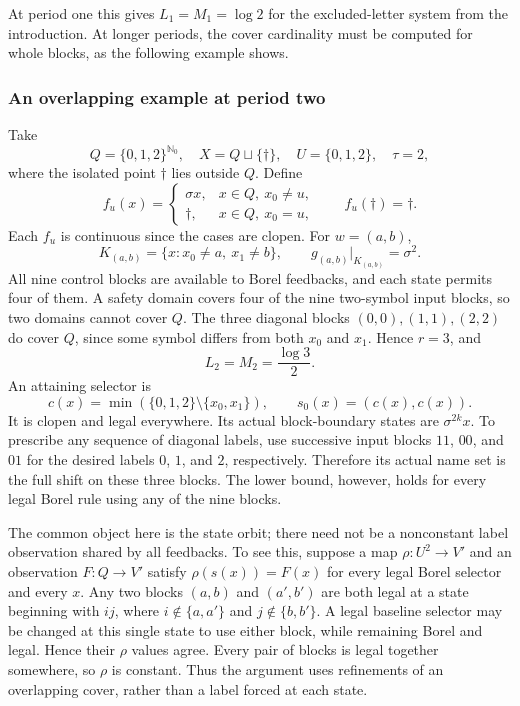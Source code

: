 \documentclass[11pt,reqno]{amsart}
\numberwithin{equation}{section}
\theoremstyle{definition}
\theoremstyle{definition}
\newcommand{\Nzero}{\mathbb N_0}
\begin{document}
At period one this gives $L_1=M_1=\log2$ for the excluded-letter
system from the introduction. At longer periods, the cover cardinality
must be computed for whole blocks, as the following example shows.

\subsubsection{An overlapping example at period two}

Take
\[
 Q=\{0,1,2\}^{\Nzero},\quad X=Q\sqcup\{\dagger\},\quad
 U=\{0,1,2\},\quad\tau=2,
\]
where the isolated point $\dagger$ lies outside $Q$. Define
\[
 f_u(x)=
 \begin{cases}\sigma x,&x\in Q,\ x_0\ne u,\\
 \dagger,&x\in Q,\ x_0=u,\end{cases}
 \qquad f_u(\dagger)=\dagger.
\]
Each $f_u$ is continuous since the cases are clopen. For $w=(a,b)$,
\[
 K_{(a,b)}=\{x:x_0\ne a,\ x_1\ne b\},\qquad
 g_{(a,b)}|_{K_{(a,b)}}=\sigma^2.
\]
All nine control blocks are available to Borel feedbacks, and each
state permits four of them. A safety domain covers four of the nine
two-symbol input blocks, so two domains cannot cover $Q$. The three
diagonal blocks $(0,0),(1,1),(2,2)$ do cover $Q$, since some symbol
differs from both $x_0$ and $x_1$. Hence $r=3$, and
\[
 L_2=M_2=\frac{\log3}{2}.
\]
An attaining selector is
\[
 c(x)=\min(\{0,1,2\}\setminus\{x_0,x_1\}),\qquad
 s_0(x)=(c(x),c(x)).
\]
It is clopen and legal everywhere. Its actual block-boundary states
are $\sigma^{2k}x$. To prescribe any sequence of diagonal labels, use
successive input blocks $11$, $00$, and $01$ for the desired labels
$0$, $1$, and $2$, respectively. Therefore its actual name set is the
full shift on these three blocks. The lower bound, however, holds for
every legal Borel rule using any of the nine blocks.

The common object here is the state orbit; there need not be a
nonconstant label observation shared by all feedbacks. To see this,
suppose a map
$\rho:U^2\to V'$ and an observation $F:Q\to V'$ satisfy
$\rho(s(x))=F(x)$ for every legal Borel selector and every $x$.
Any two blocks $(a,b)$ and $(a',b')$ are both legal at a state beginning
with $ij$, where $i\notin\{a,a'\}$ and $j\notin\{b,b'\}$.
A legal baseline selector may be changed at this single state to use
either block, while remaining Borel and legal. Hence their $\rho$
values agree. Every pair of blocks is legal together somewhere, so $\rho$
is constant. Thus the argument uses refinements of an
overlapping cover, rather than a label forced at each state.
\end{document}
